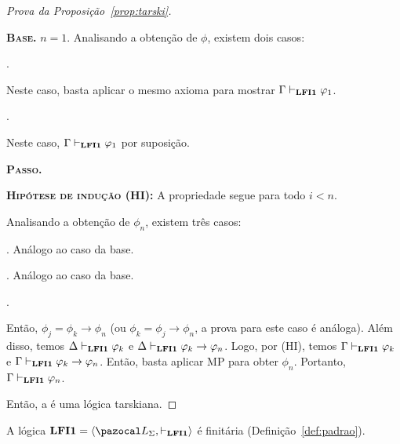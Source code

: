 \begin{proof}[Prova da Proposição~\ref{prop:tarski}]
\begin{adjustwidth}{1cm}{}
\begin{adjustwidth}{1cm}{}
                \textbf{\textsc{Base.}} $n = 1$.
                Analisando a obtenção de $\phi$, existem dois casos:
                \begin{provaporcasos}
                . 
                
                Neste caso, basta aplicar o mesmo axioma para mostrar $\Gamma \vdash_{{\normalfont\textbf{LFI1}}{}} \varphi_1$.
                
                \casodeprova{$\phi_1 \in \Delta$}. 
                
                Neste caso, $\Gamma \vdash_{{\normalfont\textbf{LFI1}}{}} \varphi_1$ por suposição.
            \end{provaporcasos}

            \noindent\textbf{\textsc{Passo.}} 
            
            \noindent \textbf{\textsc{Hipótese de indução (HI):}} A propriedade segue para todo $i < n$.

            Analisando a obtenção de $\phi_n$, existem três casos:
            \begin{provaporcasos}
                . Análogo ao caso da base.
                
                . Análogo ao caso da base.
                
                .
                
                Então, $\phi_j = \phi_k \to \phi_n$ (ou $\phi_k = \phi_j \to \phi_n$, a prova para este caso é análoga). Além disso, temos $\Delta \vdash_{{\normalfont\textbf{LFI1}}{}} \varphi_k$ e $\Delta \vdash_{{\normalfont\textbf{LFI1}}{}} \varphi_k \to \varphi_n$. Logo, por (HI), temos $\Gamma \vdash_{{\normalfont\textbf{LFI1}}{}} \varphi_k$ e $\Gamma \vdash_{{\normalfont\textbf{LFI1}}{}} \varphi_k \to \varphi_n$. Então, basta aplicar MP para obter $\phi_n$. Portanto, $\Gamma \vdash_{{\normalfont\textbf{LFI1}}{}} \varphi_n$.
            \end{provaporcasos}
        \end{adjustwidth}
    \end{adjustwidth}

        Então, a \lfium{} é uma lógica tarskiana. \qedhere
        
    \end{proof}

    
    \begin{proposicao}\label{prop:finit}        
        A lógica $\lfium{} = \langle \ling, \conhil \rangle$ é finitária (Definição~\ref{def:padrao}).
    \end{proposicao}

